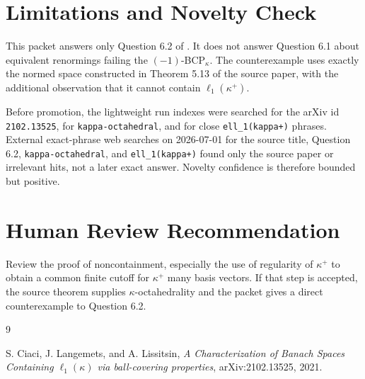\documentclass[11pt]{article}
\begin{document}
\section{Limitations and Novelty Check}

This packet answers only Question 6.2 of \cite{CLL}.  It does not answer
Question 6.1 about equivalent renormings failing the $(-1)$-BCP$_\kappa$.
The counterexample uses exactly the normed space constructed in Theorem 5.13
of the source paper, with the additional observation that it cannot contain
$\ell_1(\kappa^+)$.

Before promotion, the lightweight run indexes were searched for the arXiv id
\texttt{2102.13525}, for \texttt{kappa-octahedral}, and for close
\texttt{ell\_1(kappa+)} phrases.  External exact-phrase web searches on
2026-07-01 for the source title, Question 6.2, \texttt{kappa-octahedral}, and
\texttt{ell\_1(kappa+)} found only the source paper or irrelevant hits, not a
later exact answer.  Novelty confidence is therefore bounded but positive.

\section{Human Review Recommendation}

Review the proof of noncontainment, especially the use of regularity of
$\kappa^+$ to obtain a common finite cutoff for $\kappa^+$ many basis vectors.
If that step is accepted, the source theorem supplies $\kappa$-octahedrality
and the packet gives a direct counterexample to Question 6.2.

\begin{thebibliography}{9}

S. Ciaci, J. Langemets, and A. Lissitsin,
\emph{A Characterization of Banach Spaces Containing $\ell_1(\kappa)$ via
ball-covering properties}, arXiv:2102.13525, 2021.

\end{thebibliography}
\end{document}
